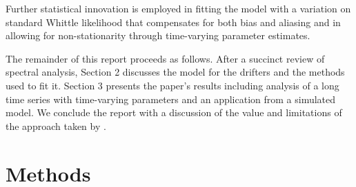 \documentclass{stat572Style}
\begin{document}
Further statistical innovation is employed in fitting the model with a variation on standard Whittle likelihood that compensates for both bias and aliasing and in allowing for non-stationarity through time-varying parameter estimates.
\par
The remainder of this report proceeds as follows.
 After a succinct review of spectral analysis, Section 2 discusses the model for the drifters and the methods used to fit it. 
 Section 3 presents the paper's results including analysis of a long time series with time-varying parameters and an application from a simulated model. 
We conclude the report with a discussion of the value and limitations of the approach taken by \citet{Sykulski2016}. 






\section{Methods}
			
\end{document}
